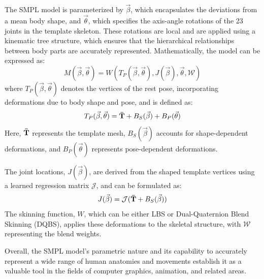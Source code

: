 The SMPL model is parameterized by $\vec{\beta}$, which encapsulates the deviations from a mean body shape, and $\vec{\theta}$, which specifies the axis-angle rotations of the 23 joints in the template skeleton. These rotations are local and are applied using a kinematic tree structure, which ensures that the hierarchical relationships between body parts are accurately represented. Mathematically, the model can be expressed as:
\begin{equation}
    M(\vec{\beta}, \vec{\theta}) = W(T_P(\vec{\beta}, \vec{\theta}), J(\vec{\beta}), \vec{\theta}, \mathcal{W})
\end{equation}
where $T_P(\vec{\beta}, \vec{\theta})$ denotes the vertices of the rest pose, incorporating deformations due to body shape and pose, and is defined as:
\begin{equation}
    T_P(\vec{\beta}, \vec{\theta}) = \boldsymbol{\mathbf{\bar{T}}} + B_S(\vec{\beta}) + B_P(\vec{\theta})
\end{equation}
Here, $\boldsymbol{\mathbf{\bar{T}}}$ represents the template mesh, $B_S(\vec{\beta})$ accounts for shape-dependent deformations, and $B_P(\vec{\theta})$ represents pose-dependent deformations.

The joint locations, $J(\vec{\beta})$, are derived from the shaped template vertices using a learned regression matrix $\mathcal{J}$, and can be formulated as:
\begin{equation}
    J(\vec{\beta}) = \mathcal{J}(\boldsymbol{\mathbf{\bar{T}}} + B_S(\vec{\beta}))
\end{equation}
The skinning function, $W$, which can be either LBS or Dual-Quaternion Blend Skinning (DQBS), applies these deformations to the skeletal structure, with $\mathcal{W}$ representing the blend weights.

Overall, the SMPL model's parametric nature and its capability to accurately represent a wide range of human anatomies and movements establish it as a valuable tool in the fields of computer graphics, animation, and related areas.



